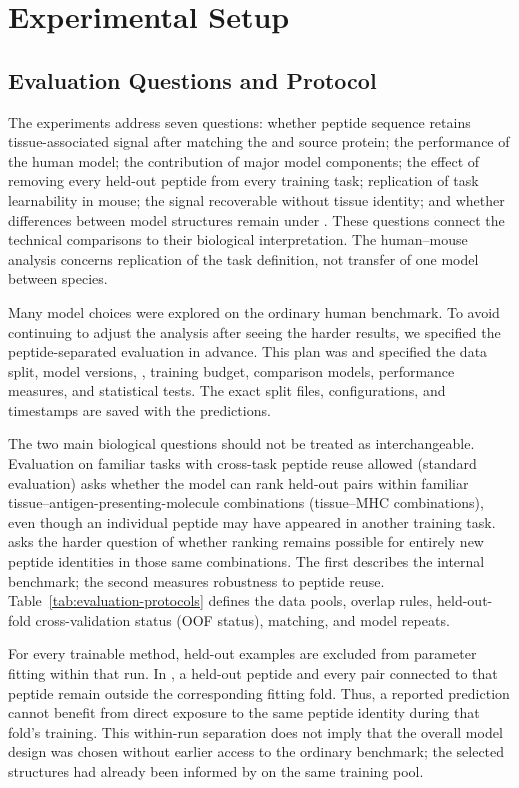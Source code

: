 \section{Experimental Setup}

\subsection{Evaluation Questions and Protocol}

The experiments address seven questions: whether peptide sequence retains tissue-associated signal after matching the \plainMHC{} and source protein; the performance of the human model; the contribution of major model components; the effect of removing every held-out peptide from every training task; replication of task learnability in mouse; the signal recoverable without tissue identity; and whether differences between model structures remain under \plainPeptideOOF{}. These questions connect the technical comparisons to their biological interpretation. The human--mouse analysis concerns replication of the task definition, not transfer of one model between species.

Many model choices were explored on the ordinary human benchmark. To avoid continuing to adjust the analysis after seeing the harder results, we specified the peptide-separated evaluation in advance. This plan was \plainFrozen{} and specified the data split, model versions, \plainSeeds{}, training budget, comparison models, performance measures, and statistical tests. The exact split files, configurations, and timestamps are saved with the predictions.

The two main biological questions should not be treated as interchangeable. Evaluation on familiar tasks with cross-task peptide reuse allowed (standard evaluation) asks whether the model can rank held-out pairs within familiar tissue--antigen-presenting-molecule combinations (tissue--MHC combinations), even though an individual peptide may have appeared in another training task. \plainPeptideOOF{} asks the harder question of whether ranking remains possible for entirely new peptide identities in those same combinations. The first describes the internal benchmark; the second measures robustness to peptide reuse. Table~\ref{tab:evaluation-protocols} defines the data pools, overlap rules, held-out-fold cross-validation status (OOF status), matching, and model repeats.

For every trainable method, held-out examples are excluded from parameter fitting within that run. In \plainPeptideOOF{}, a held-out peptide and every pair connected to that peptide remain outside the corresponding fitting fold. Thus, a reported prediction cannot benefit from direct exposure to the same peptide identity during that fold's training. This within-run separation does not imply that the overall model design was chosen without earlier access to the ordinary benchmark; the selected structures had already been informed by \plainPairOOF{} on the same training pool.

